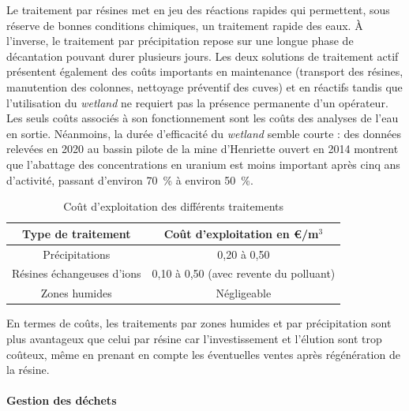 \documentclass{article}
\begin{document}
Le traitement par résines met en jeu des réactions rapides qui permettent, sous réserve de bonnes conditions chimiques, un traitement rapide des eaux. \`A l’inverse, le traitement par précipitation repose sur une longue phase de décantation pouvant durer plusieurs jours. Les deux solutions de traitement actif présentent également des coûts importants en maintenance (transport des résines, manutention des colonnes, nettoyage préventif des cuves) et en réactifs tandis que l’utilisation du \textit{wetland} ne requiert pas la présence permanente d’un opérateur. Les seuls coûts associés à son fonctionnement sont les coûts des analyses de l’eau en sortie.  Néanmoins, la durée d’efficacité du \textit{wetland} semble courte : des données relevées en 2020 au bassin pilote de la mine d’Henriette ouvert en 2014 montrent que l’abattage des concentrations en uranium est moins important après cinq ans d’activité, passant d'environ 70~\% à environ 50~\%. %

\begin{table}[H]
   \centering
   \caption{Coût d'exploitation des différents traitements \cite{schick_les_2020}}
   \begin{tabular}{ |c |c |}
        \hline
        \textbf{Type de traitement} & \textbf{Coût d’exploitation en \euro{}/m$^3$} \\ 
        \hline
        Précipitations & 0,20 à 0,50 \\ 
        \hline
        Résines échangeuses d’ions & 0,10 à 0,50 (avec revente du polluant)  \\
        \hline
        Zones humides & Négligeable  \\
        \hline
    \end{tabular}
\label{tab:cout_exploitation_traitements}
\end{table}

En termes de coûts, les traitements par zones humides et par précipitation sont plus avantageux que celui par résine car l’investissement et l’élution sont trop coûteux, même en prenant en compte les éventuelles ventes après régénération de la résine. %

\paragraph{Gestion des déchets \\ \\}
\end{document}
